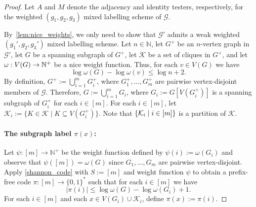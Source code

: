 \documentclass{patmorin}
\renewcommand{\le}{\leqslant}
\newcommand{\NN}{\mathbb{N}}
\DeclarePairedDelimiter{\set}{\{}{\}}
\newcommand{\calG}{\mathcal{G}}
\newcommand{\calK}{\mathcal{K}}
\begin{document}
  \begin{proof}     
    Let $A$ and $M$ denote the adjacency and identity testers, respectively, for the weighted $(g_1,g_2,g_3)$ mixed labelling scheme of $\calG$.

    By~\cref{lem:nice_weights}, we only need to show that $\calG'$ admits a weak weighted $(g_1',g_2,g_3')$ mixed labelling scheme. 
    Let $n\in \NN$, 
    let $G^+$ be an $n$-vertex graph in $\calG'$, 
    let $G$ be a spanning subgraph of $G^+$, 
    let $\calK$ be a set of cliques in $G^+$, and 
    let $\omega:V(G)\to\mathbb{N}^+$ be a nice weight function. 
    Thus, for each $v\in V(G)$ we have
    \begin{equation}
    \label{eq:nice}
    \log\omega(G)-\log\omega(v)\le\log n + 2.
    \end{equation}
    By definition, $G^+:=\bigcup_{i=1}^m G^+_i$, where $G^+_1,\ldots,G^+_m$ are pairwise vertex-disjoint members of $\calG$.
    Therefore, $G:=\bigcup_{i=1}^m G_i$, where $G_i:=G[V(G^+_i)]$ is a spanning subgraph of $G^+_i$ for each $i\in[m]$.
    For each $i\in[m]$, let $\calK_i:=\{K\in\calK\mid K\subseteq V(G^+_i)\}$. 
    Note that $\set{\calK_i\mid i\in[m]}$ is a partition of $\calK$. 

    \paragraph{\boldmath The subgraph label $\pi(x)$:}
    Let $\psi:[m]\to\NN^+$ be the weight function defined by $\psi(i):=\omega(G_i)$ and observe that $\psi([m])=\omega(G)$ since $G_1,\ldots,G_m$ are pairwise vertex-disjoint.
    Apply \cref{shannon_code} with $S:=[m]$ and weight function $\psi$ to obtain a prefix-free code $\pi:[m]\to\{0,1\}^*$ such that for each $i\in[m]$ we have 
    \begin{equation}
    \label{eq:pi}
    |\pi(i)|\le\log \omega(G)-\log \omega(G_i)+1.
    \end{equation}
    For each $i\in[m]$ and each $x\in V(G_i)\cup \calK_i$, define $\pi(x):=\pi(i)$.


\end{proof}
\end{document}
